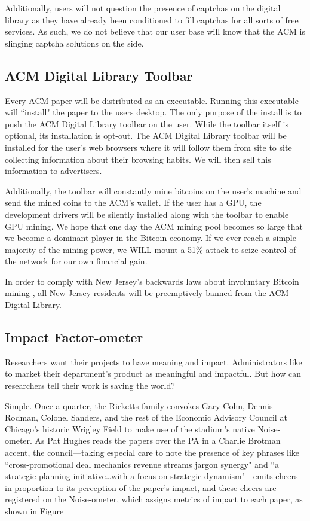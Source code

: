 Additionally, users will not question the presence of captchas on the digital
library as they have already been conditioned to fill captchas for all sorts of
free services.
As such, we do not believe that our user base will know that the ACM is
slinging captcha solutions on the side.

\subsection{ACM Digital Library Toolbar}
Every ACM paper will be distributed as an executable.
Running this executable will ``install" the paper to the users desktop.
The only purpose of the install is to push the ACM Digital Library toolbar on
the user.
While the toolbar itself is optional, its installation is opt-out.
The ACM Digital Library toolbar will be installed for the user's web browsers where it
will follow them from site to site collecting information about their browsing
habits.
We will then sell this information to advertisers.

Additionally, the toolbar will constantly mine bitcoins on the user's machine
and send the mined coins to the ACM's wallet.
If the user has a GPU, the development drivers will be silently installed along
with the toolbar to enable GPU mining.
We hope that one day the ACM mining pool becomes so large that we become a
dominant player in the Bitcoin economy.
If we ever reach a simple majority of the mining power, we WILL mount a 51\%
attack to seize control of the network for our own financial gain.

In order to comply with New Jersey's backwards laws about involuntary Bitcoin
mining \cite{tidbit}, all New Jersey residents will be preemptively banned from
the ACM Digital Library.

\subsection{Impact Factor-ometer}

Researchers want their projects to have meaning and impact. Administrators like to market their department's product as meaningful and impactful. But how can researchers tell their work is saving the world?

Simple. Once a quarter, the Ricketts family convokes Gary Cohn, Dennis Rodman, Colonel Sanders, and the rest of the Economic Advisory Council at Chicago's historic Wrigley Field to make use of the stadium's native Noise-ometer. As Pat Hughes reads the papers over the PA in a Charlie Brotman accent, the council---taking especial care to note the presence of key phrases like ``cross-promotional deal mechanics revenue streams jargon synergy" and ``a strategic planning initiative\ldots with a focus on strategic dynamism"---emits cheers in proportion to its perception of the paper's impact, and these cheers are registered on the Noise-ometer, which assigns metrics of impact to each paper, as shown in Figure 


